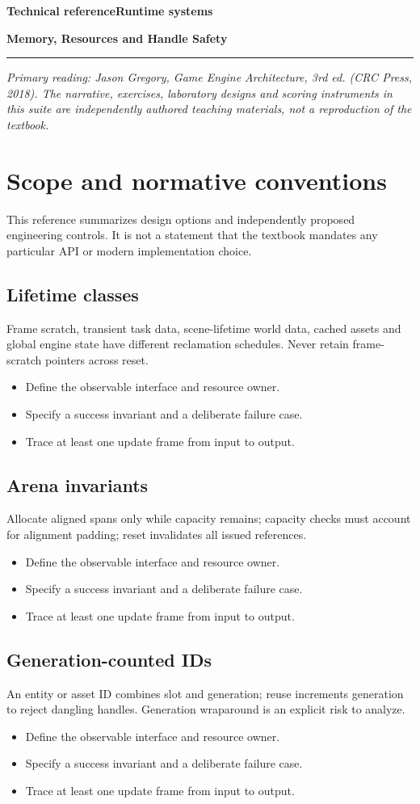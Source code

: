 \documentclass[11pt,letterpaper]{article}
\newcommand{\DocType}{Reference}
\newcommand{\SuiteHeading}[3]{%
\renewcommand{\DocType}{#2}%
{\small\bfseries\sffamily\color{EngineTeal}#2\hfill #3}\par\vspace{6pt}
{\LARGE\bfseries\color{EngineBlue}#1}\par\vspace{4pt}
{\color{EngineTeal}\rule{\linewidth}{1pt}}\par\vspace{7pt}}
\newcommand{\SourceNote}{\footnotesize\textit{Primary reading: Jason Gregory, \emph{Game Engine Architecture}, 3rd ed. (CRC Press, 2018). The narrative, exercises, laboratory designs and scoring instruments in this suite are independently authored teaching materials, not a reproduction of the textbook.}\normalsize\par}
\begin{document}
\SuiteHeading{Memory, Resources and Handle Safety}{Technical reference}{Runtime systems}
\SourceNote
\section{Scope and normative conventions}
This reference summarizes design options and independently proposed engineering controls. It is not a statement that the textbook mandates any particular API or modern implementation choice.

\subsection{Lifetime classes}
Frame scratch, transient task data, scene-lifetime world data, cached assets and global engine state have different reclamation schedules. Never retain frame-scratch pointers across reset.

\begin{itemize}
\item Define the observable interface and resource owner.
\item Specify a success invariant and a deliberate failure case.
\item Trace at least one update frame from input to output.
\end{itemize}
\subsection{Arena invariants}
Allocate aligned spans only while capacity remains; capacity checks must account for alignment padding; reset invalidates all issued references.

\begin{itemize}
\item Define the observable interface and resource owner.
\item Specify a success invariant and a deliberate failure case.
\item Trace at least one update frame from input to output.
\end{itemize}
\subsection{Generation-counted IDs}
An entity or asset ID combines slot and generation; reuse increments generation to reject dangling handles. Generation wraparound is an explicit risk to analyze.

\begin{itemize}
\item Define the observable interface and resource owner.
\item Specify a success invariant and a deliberate failure case.
\item Trace at least one update frame from input to output.
\end{itemize}
\end{document}
